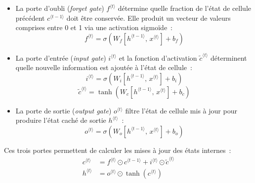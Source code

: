 \begin{itemize}
    \item La porte d'oubli (\textit{forget gate}) $f^{\langle t \rangle}$ détermine quelle fraction de l'état de cellule précédent $c^{\langle t-1 \rangle}$ doit être conservée. Elle produit un vecteur de valeurs comprises entre 0 et 1 via une activation sigmoïde~:
    \begin{equation}
        f^{\langle t \rangle} = \sigma\!\left(W_f \left[h^{\langle t-1 \rangle},\, x^{\langle t \rangle}\right] + b_f\right)
        \label{eq:lstm_forget}
    \end{equation}

    \item La porte d'entrée (\textit{input gate}) $i^{\langle t \rangle}$ et la fonction d'activation $\tilde{c}^{\langle t \rangle}$ déterminent quelle nouvelle information est ajoutée à l'état de cellule~:
    \begin{equation}
        i^{\langle t \rangle} = \sigma\!\left(W_i \left[h^{\langle t-1 \rangle},\, x^{\langle t \rangle}\right] + b_i\right)
        \label{eq:lstm_input}
    \end{equation}
    \begin{equation}
        \tilde{c}^{\langle t \rangle} = \tanh\!\left(W_c \left[h^{\langle t-1 \rangle},\, x^{\langle t \rangle}\right] + b_c\right)
        \label{eq:lstm_candidate}
    \end{equation}

    \item La porte de sortie (\textit{output gate}) $o^{\langle t \rangle}$ filtre l'état de cellule mis à jour pour produire l'état caché de sortie $h^{\langle t \rangle}$~:
    \begin{equation}
        o^{\langle t \rangle} = \sigma\!\left(W_o \left[h^{\langle t-1 \rangle},\, x^{\langle t \rangle}\right] + b_o\right)
        \label{eq:lstm_output_gate}
    \end{equation}
\end{itemize}

Ces trois portes permettent de calculer les mises à jour des états internes~:
\begin{align}
    c^{\langle t \rangle} &= f^{\langle t \rangle} \odot c^{\langle t-1 \rangle} + i^{\langle t \rangle} \odot \tilde{c}^{\langle t \rangle}
    \label{eq:lstm_cell_update} \\
    h^{\langle t \rangle} &= o^{\langle t \rangle} \odot \tanh\!\left(c^{\langle t \rangle}\right)
    \label{eq:lstm_hidden_update}
\end{align}

